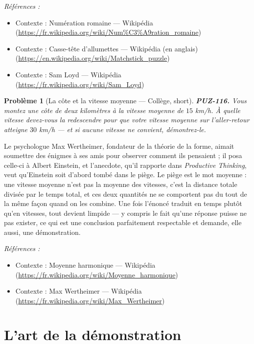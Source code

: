 \documentclass[11pt]{article}
\newtheorem{problem}{Problème}
\newenvironment{refs}{\par\small\noindent\emph{Références :}\begin{itemize}\setlength\itemsep{0pt}}{\end{itemize}\normalsize}
\begin{document}
\begin{refs}
\item Contexte : Numération romaine --- Wikipédia (\url{https://fr.wikipedia.org/wiki/Num%C3%A9ration_romaine})
\item Contexte : Casse-tête d'allumettes --- Wikipédia (en anglais) (\url{https://en.wikipedia.org/wiki/Matchstick_puzzle})
\item Contexte : Sam Loyd --- Wikipédia (\url{https://fr.wikipedia.org/wiki/Sam_Loyd})
\end{refs}

\bigskip

\begin{problem}[{La côte et la vitesse moyenne --- Collège, short}]
\textbf{PUZ-116.} Vous montez une côte de deux kilomètres à la vitesse
moyenne de $ 15 $ km/h. À quelle vitesse devez-vous la redescendre pour que votre vitesse
moyenne sur l'aller-retour atteigne $ 30 $ km/h --- et si aucune vitesse ne convient,
démontrez-le.
\end{problem}

\noindent Le psychologue Max Wertheimer, fondateur de la théorie de la forme, aimait
soumettre des énigmes à ses amis pour observer comment ils pensaient ; il posa celle-ci à
Albert Einstein, et l'anecdote, qu'il rapporte dans \textit{Productive Thinking}, veut
qu'Einstein soit d'abord tombé dans le piège. Le piège est le mot \og{} moyenne \fg{} : une vitesse
moyenne n'est pas la moyenne des vitesses, c'est la distance totale divisée par le temps
total, et ces deux quantités ne se comportent pas du tout de la même façon quand on les
combine. Une fois l'énoncé traduit en temps plutôt qu'en vitesses, tout devient limpide --- y
compris le fait qu'une réponse puisse ne pas exister, ce qui est une conclusion parfaitement
respectable et demande, elle aussi, une démonstration.

\begin{refs}
\item Contexte : Moyenne harmonique --- Wikipédia (\url{https://fr.wikipedia.org/wiki/Moyenne_harmonique})
\item Contexte : Max Wertheimer --- Wikipédia (\url{https://fr.wikipedia.org/wiki/Max_Wertheimer})
\end{refs}

\bigskip


\section*{L'art de la démonstration}
\end{document}
